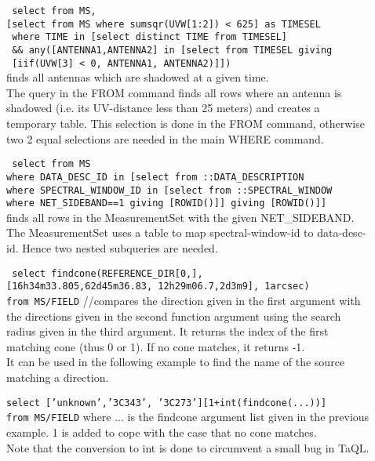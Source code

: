 \begin{description}
  \item[] \texttt{ select from MS,}
      \\\texttt{[select from MS where sumsqr(UVW[1:2]) < 625] as TIMESEL}
      \\\texttt{ where TIME in [select distinct TIME from TIMESEL]}
      \\\texttt{   \&\& any([ANTENNA1,ANTENNA2] in [select from TIMESEL giving}
      \\\texttt{                      [iif(UVW[3] < 0, ANTENNA1, ANTENNA2)]])}
      \\finds all antennas which are shadowed at a given time.
      \\The query in the FROM command finds all rows where an antenna
      is shadowed (i.e. its UV-distance less than 25 meters) and
      creates a temporary table. This selection is done in the FROM
      command, otherwise two 2 equal selections are needed in the main
      WHERE command.
      
  \item[] \texttt{ select from MS}
      \\\texttt{where DATA\_DESC\_ID in [select from ::DATA\_DESCRIPTION}
      \\\texttt{where SPECTRAL\_WINDOW\_ID in [select from ::SPECTRAL\_WINDOW}
      \\\texttt{where NET\_SIDEBAND==1 giving [ROWID()]] giving [ROWID()]]}
      \\finds all rows in the MeasurementSet with the given
      NET\_SIDEBAND.
      \\The MeasurementSet uses a table to map spectral-window-id to
      data-desc-id. Hence two nested subqueries are needed.

    \item[] \texttt{ select findcone(REFERENCE\_DIR[0,],}
     \\\texttt{[16h34m33.805,62d45m36.83, 12h29m06.7,2d3m9], 1arcsec)}
     \\\texttt{from MS/FIELD}
     //compares the direction given in the first argument with the
     directions given in the second function argument using the search
     radius given in the third argument. It returns the index of the
     first matching cone (thus 0 or 1). If no cone matches, it returns -1.
     \\It can be used in the following example to find the name of the
     source matching a direction.

     \item[] \texttt{select ['unknown','3C343', '3C273'][1+int(findcone(...))]}
       \\\texttt{from MS/FIELD}
       where ... is the findcone argument list given in the previous
       example. 1 is added to cope with the case that no cone matches.
       \\Note that the conversion to int is done to circumvent a small
       bug in TaQL. 
\end{description}

